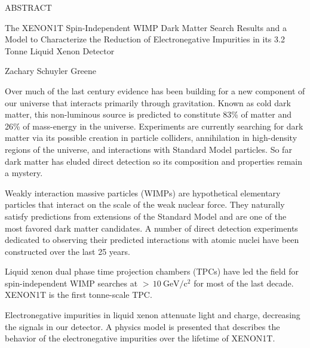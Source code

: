 
\pagestyle{empty} %
\begin{center}
  ABSTRACT

The XENON1T Spin-Independent WIMP Dark Matter Search Results and a Model to Characterize the Reduction of Electronegative Impurities in
its 3.2 Tonne Liquid Xenon Detector

Zachary Schuyler Greene
\end{center}

Over much of the last century evidence has been building for a new component of our universe that interacts primarily through
gravitation.  Known as cold dark matter, this non-luminous source is predicted to constitute 83\% of matter and 26\% of mass-energy in the
universe.  Experiments are currently searching for dark matter via its possible creation in particle colliders, annihilation in
high-density regions of the universe, and interactions with Standard Model particles.  So far dark matter has eluded direct detection so its
composition and properties remain a mystery.

Weakly interaction massive particles (WIMPs) are hypothetical elementary particles that interact on the scale of the weak nuclear
force.  They naturally satisfy predictions from extensions of the Standard Model and are one of the most favored dark matter
candidates.  A number of direct detection experiments dedicated to observing their predicted interactions with atomic nuclei have been
constructed over the last 25 years.

Liquid xenon dual phase time projection chambers (TPCs) have led the field for spin-independent WIMP searches at
${>}\, 10\ \mathrm{GeV/c^2}$ for most
of the last decade.  XENON1T is the first tonne-scale TPC.

Electronegative impurities in liquid xenon attenuate light and charge, decreasing the signals in our detector.  A physics model is
presented that describes the behavior of the electronegative impurities over the lifetime of XENON1T.
